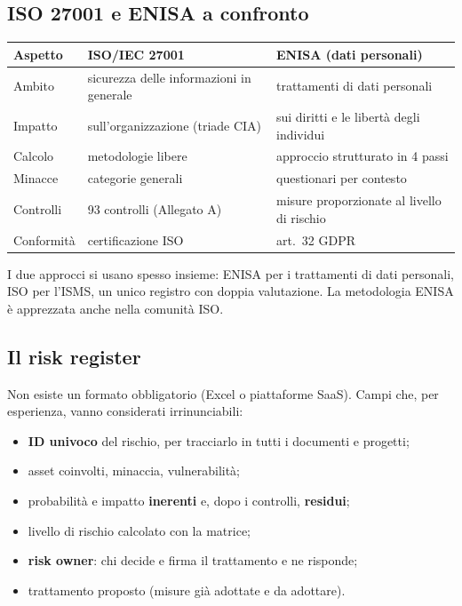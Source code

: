 \subsection{ISO 27001 e ENISA a confronto}
\begin{center}
\small
\begin{tabularx}{\linewidth}{l X X}
\toprule
\textbf{Aspetto} & \textbf{ISO/IEC 27001} & \textbf{ENISA (dati personali)} \\ \midrule
Ambito & sicurezza delle informazioni in generale & trattamenti di dati personali \\
Impatto & sull'organizzazione (triade CIA) & sui diritti e le libertà degli individui \\
Calcolo & metodologie libere & approccio strutturato in 4 passi \\
Minacce & categorie generali & questionari per contesto \\
Controlli & 93 controlli (Allegato A) & misure proporzionate al livello di rischio \\
Conformità & certificazione ISO & art.~32 GDPR \\ \bottomrule
\end{tabularx}
\end{center}
I due approcci si usano spesso insieme: ENISA per i trattamenti di dati personali, ISO per l'ISMS, un
unico registro con doppia valutazione. La metodologia ENISA è apprezzata anche nella comunità ISO.

\subsection{Il risk register}
Non esiste un formato obbligatorio (Excel o piattaforme SaaS). Campi che, per esperienza, vanno considerati
irrinunciabili:
\begin{itemize}
  \item \textbf{ID univoco} del rischio, per tracciarlo in tutti i documenti e progetti;
  \item asset coinvolti, minaccia, vulnerabilità;
  \item probabilità e impatto \textbf{inerenti} e, dopo i controlli, \textbf{residui};
  \item livello di rischio calcolato con la matrice;
  \item \textbf{risk owner}: chi decide e firma il trattamento e ne risponde;
  \item trattamento proposto (misure già adottate e da adottare).
\end{itemize}

